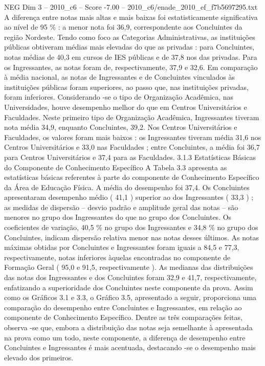 \begin{textsample}{NEG Dim 3 – 2010\_c6 – Score -7.00 – 2010\_c6/enade\_2010\_ef\_f7b5697295.txt}
A diferença entre notas mais altas e mais baixas foi estatisticamente significativa ao nível de 95 \% : a menor nota foi 36,9, correspondente aos Concluintes da região Nordeste.
Tendo como foco as Categorias Administrativas, as instituições públicas obtiveram médias mais elevadas do que as privadas : para Concluintes, notas médias de 40,3 em cursos de IES públicas e de 37,8 nos das privadas.
Para os Ingressantes, as notas foram de, respectivamente, 37,9 e 32,6.
Em comparação à média nacional, as notas de Ingressantes e de Concluintes vinculados às instituições públicas foram superiores, ao passo que, nas instituições privadas, foram inferiores.
Considerando -se o tipo de Organização Acadêmica, nas Universidades, houve desempenho melhor do que em Centros Universitários e Faculdades.
Neste primeiro tipo de Organização Acadêmica, Ingressantes tiveram nota média 34,9, enquanto Concluintes, 39,2.
Nos Centros Universitários e Faculdades, os valores foram mais baixos : os Ingressantes tiveram média 31,6 nos Centros Universitários e 33,0 nas Faculdades ; entre Concluintes, a média foi 36,7 para Centros Universitários e 37,4 para as Faculdades. 3.1.3 Estatísticas Básicas do Componente de Conhecimento Específico A Tabela 3.3 apresenta as estatísticas básicas referentes à parte do componente de Conhecimento Específico da Área de Educação Física.
A média do desempenho foi 37,4.
Os Concluintes apresentaram desempenho médio ( 41,1 ) superior ao dos Ingressantes ( 33,3 ) ; as medidas de dispersão – desvio padrão e amplitude geral das notas – são menores no grupo dos Ingressantes do que no grupo dos Concluintes.
Os coeficientes de variação, 40,5 \% no grupo dos Ingressantes e 34,8 \% no grupo dos Concluintes, indicam dispersão relativa menor nas notas desses últimos.
As notas máximas obtidas por Concluintes e Ingressantes foram iguais a 84,5 e 77,3, respectivamente, notas inferiores àquelas encontradas no componente de Formação Geral ( 95,0 e 91,5, respectivamente ).
As medianas das distribuições das notas dos Ingressantes e dos Concluintes foram 32,9 e 41,7, respectivamente, enfatizando a superioridade dos Concluintes neste componente da prova.
Assim como os Gráficos 3.1 e 3.3, o Gráfico 3.5, apresentado a seguir, proporciona uma comparação do desempenho entre Concluintes e Ingressantes, em relação ao componente de Conhecimento Específico.
Dentre as três comparações feitas, observa -se que, embora a distribuição das notas seja semelhante à apresentada na prova como um todo, neste componente, a diferença de desempenho entre Concluintes e Ingressantes é mais acentuada, destacando -se o desempenho mais elevado dos primeiros.

\end{textsample}
